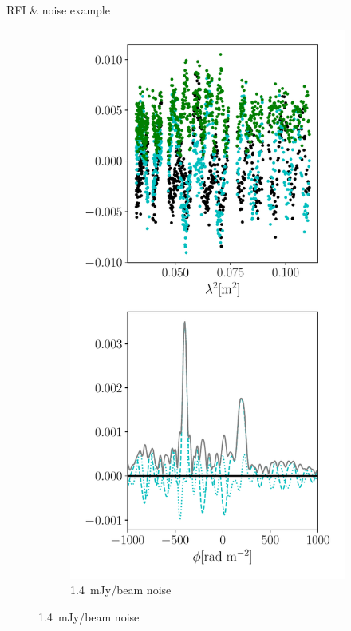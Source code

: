 \documentclass[xetex,aspectratio=169]{beamer}
\begin{document}
\begin{frame}{RFI \& noise example}
\begin{figure}
\begin{subfigure}{0.2\textwidth}
		\end{subfigure}
		\begin{subfigure}{0.2\textwidth}
			\includegraphics[width=\textwidth]{figures/dataset_features/data_noisy.pdf}
			\caption{1.4~mJy/beam noise}
		\end{subfigure}
	\end{figure}

\end{frame}
\end{document}
